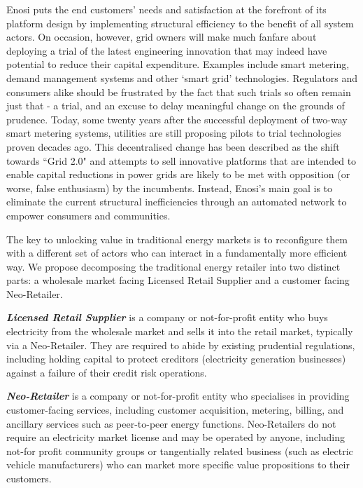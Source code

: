 \documentclass[a4paper,12pt,reqno]{amsart}
\theoremstyle{definition}
\begin{document}
Enosi puts the end customers' needs and satisfaction at the forefront of its platform design by implementing structural efficiency to the benefit of all system actors. On occasion, however, grid owners will make much fanfare about deploying a trial of the latest engineering innovation that may indeed have potential to reduce their capital expenditure. Examples include smart metering, demand management systems and other `smart grid' technologies. Regulators and consumers alike should be frustrated by the fact that such trials so often remain just that - a trial, and an excuse to delay meaningful change on the grounds of prudence. Today, some twenty years after the successful deployment of two-way smart metering systems, utilities are still proposing pilots to trial technologies proven decades ago. This decentralised change has been described as the shift towards ``Grid 2.0" and attempts to sell innovative platforms that are intended to enable capital reductions in power grids are likely to be met with opposition (or worse, false enthusiasm) by the incumbents. Instead, Enosi's main goal is to eliminate the current structural inefficiencies through an automated network to empower consumers and communities.

The key to unlocking value in traditional energy markets is to reconfigure them with a different set of actors who can interact in a fundamentally more efficient way. We propose decomposing the traditional energy retailer into two distinct parts: a wholesale market facing Licensed Retail Supplier and a customer facing Neo-Retailer.

\noindent \textbf{\textit{Licensed Retail Supplier}} is a company or not-for-profit entity who buys electricity from the wholesale market and sells it into the retail market, typically via a Neo-Retailer. They are required to abide by existing prudential regulations, including holding capital to protect creditors (electricity generation businesses) against a failure of their credit risk operations.

\noindent \textbf{\textit{Neo-Retailer}} is a company or not-for-profit entity who specialises in providing customer-facing services, including customer acquisition, metering, billing, and ancillary services such as peer-to-peer energy functions. Neo-Retailers do not require an electricity market license and may be operated by anyone, including not-for profit community groups or tangentially related business (such as electric vehicle manufacturers) who can market more specific value propositions to their customers.
\end{document}
